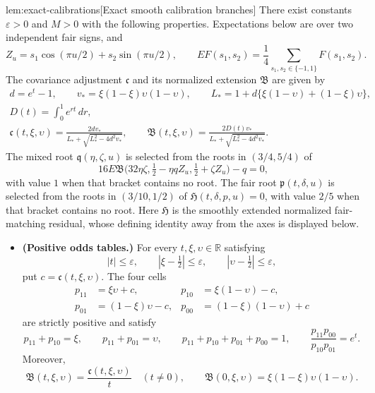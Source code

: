 \documentclass[11pt]{article}
\begin{document}
\begin{lemmav}{lem:exact-calibrations}[Exact smooth calibration branches]
There exist constants \(\varepsilon>0\) and \(M>0\) with the following properties. Expectations below are over two independent fair signs, and
\[
Z_u=s_1\cos(\pi u/2)+s_2\sin(\pi u/2),
\qquad
E F(s_1,s_2)=\frac14\sum_{s_1,s_2\in\{-1,1\}}F(s_1,s_2).
\]
The covariance adjustment \(\mathfrak c\) and its normalized extension \(\mathfrak B\) are given by
\[
\begin{gathered}
d=e^t-1,\qquad
v_*=\xi(1-\xi)\upsilon(1-\upsilon),\qquad
L_*=1+d\{\xi(1-\upsilon)+(1-\xi)\upsilon\},\\
D(t)=\int_0^1 e^{rt}\,dr,\\
\mathfrak c(t,\xi,\upsilon)
=\frac{2d v_*}{L_*+\sqrt{L_*^2-4d^2v_*}},
\qquad
\mathfrak B(t,\xi,\upsilon)
=\frac{2D(t)v_*}{L_*+\sqrt{L_*^2-4d^2v_*}}.
\end{gathered}
\]
The mixed root \(\mathfrak q(\eta,\zeta,u)\) is selected from the roots in \((3/4,5/4)\) of
\[
16E\mathfrak B
 \bigl(32\eta\zeta,\tfrac12-\eta qZ_u,\tfrac12+\zeta Z_u\bigr)-q=0,
\]
with value \(1\) when that bracket contains no root. The fair root
\(\mathfrak p(t,\delta,u)\) is selected from the roots in \((3/10,1/2)\) of
\(\mathfrak H(t,\delta,p,u)=0\), with value \(2/5\) when that bracket contains no root. Here \(\mathfrak H\) is the smoothly extended normalized fair-matching residual, whose defining identity away from the axes is displayed below.

\begin{itemize}
\item \textbf{(Positive odds tables.)}
For every \(t,\xi,\upsilon\in\mathbb R\) satisfying
\[
|t|\le\varepsilon,\qquad
|\xi-\tfrac12|\le\varepsilon,\qquad
|\upsilon-\tfrac12|\le\varepsilon,
\]
put \(c=\mathfrak c(t,\xi,\upsilon)\). The four cells
\[
\begin{aligned}
p_{11}&=\xi\upsilon+c,&
p_{10}&=\xi(1-\upsilon)-c,\\
p_{01}&=(1-\xi)\upsilon-c,&
p_{00}&=(1-\xi)(1-\upsilon)+c
\end{aligned}
\]
are strictly positive and satisfy
\[
p_{11}+p_{10}=\xi,\qquad
p_{11}+p_{01}=\upsilon,\qquad
p_{11}+p_{10}+p_{01}+p_{00}=1,\qquad
\frac{p_{11}p_{00}}{p_{10}p_{01}}=e^t.
\]
Moreover,
\[
\mathfrak B(t,\xi,\upsilon)=\frac{\mathfrak c(t,\xi,\upsilon)}{t}
\quad(t\ne0),\qquad
\mathfrak B(0,\xi,\upsilon)=\xi(1-\xi)\upsilon(1-\upsilon).
\]


\end{itemize}
\end{lemmav}
\end{document}
